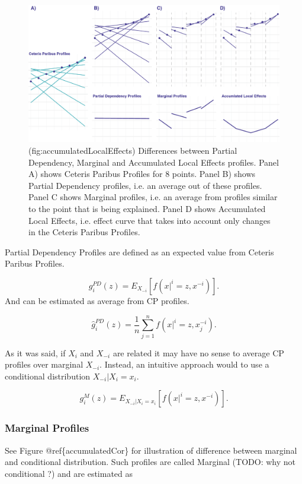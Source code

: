 \documentclass[]{krantz}
\theoremstyle{definition}
\theoremstyle{definition}
\theoremstyle{definition}
\theoremstyle{remark}
\begin{document}
\begin{figure}

{\centering \includegraphics[width=0.9\linewidth]{figure/CP_ALL} 

}

\caption{(fig:accumulatedLocalEffects) Differences between Partial Dependency, Marginal and Accumulated Local Effects profiles. Panel A) shows Ceteris Paribus Profiles for 8 points. Panel B) shows Partial Dependency profiles, i.e. an average out of these profiles. Panel C shows Marginal profiles, i.e. an average from profiles similar to the point that is being explained. Panel D shows Accumulated Local Effects, i.e. effect curve that takes into account only changes in the Ceteris Paribus Profiles.}\label{fig:accumulatedLocalEffects}
\end{figure}

Partial Dependency Profiles are defined as an expected value from
Ceteris Paribus Profiles.

\[
g^{PD}_i(z) = E_{X_{-i}}[ f(x|^i = z, x^{-i}) ].
\] And can be estimated as average from CP profiles.

\[
\hat g^{PD}_i(z) = \frac{1}{n} \sum_{j=1}^{n} f(x|^i = z, x_j^{-i}).
\]

As it was said, if \(X_i\) and \(X_{-i}\) are related it may have no
sense to average CP profiles over marginal \(X_{-i}\). Instead, an
intuitive approach would to use a conditional distribution
\(X_{-i}|X_i=x_i\).

\[
g^{M}_i(z) = E_{X_{-i}|X_i=x_i}[ f(x|^i = z, x^{-i}) ].
\]

\hypertarget{marginal-profiles}{%
\subsubsection{Marginal Profiles}\label{marginal-profiles}}

See Figure @ref\{accumulatedCor\} for illustration of difference between
marginal and conditional distribution. Such profiles are called Marginal
(TODO: why not conditional ?) and are estimated as
\end{document}
